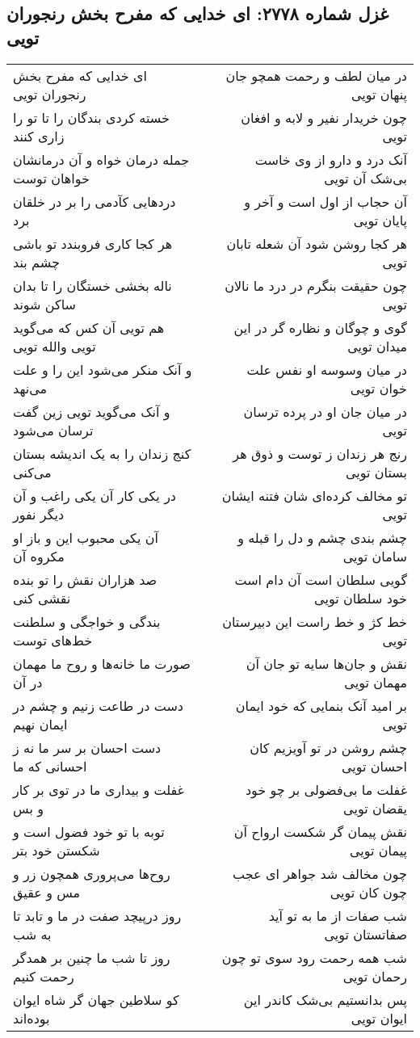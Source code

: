 \begin{center}
\section*{غزل شماره ۲۷۷۸: ای خدایی که مفرح بخش رنجوران تویی}
\label{sec:2778}
\begin{longtable}{l p{0.5cm} r}
ای خدایی که مفرح بخش رنجوران تویی
&&
در میان لطف و رحمت همچو جان پنهان تویی
\\
خسته کردی بندگان را تا تو را زاری کنند
&&
چون خریدار نفیر و لابه و افغان تویی
\\
جمله درمان خواه و آن درمانشان خواهان توست
&&
آنک درد و دارو از وی خاست بی‌شک آن تویی
\\
دردهایی کآدمی را بر در خلقان برد
&&
آن حجاب از اول است و آخر و پایان تویی
\\
هر کجا کاری فروبندد تو باشی چشم بند
&&
هر کجا روشن شود آن شعله تابان تویی
\\
ناله بخشی خستگان را تا بدان ساکن شوند
&&
چون حقیقت بنگرم در درد ما نالان تویی
\\
هم تویی آن کس که می‌گوید تویی والله تویی
&&
گوی و چوگان و نظاره گر در این میدان تویی
\\
و آنک منکر می‌شود این را و علت می‌نهد
&&
در میان وسوسه او نفس علت خوان تویی
\\
و آنک می‌گوید تویی زین گفت ترسان می‌شود
&&
در میان جان او در پرده ترسان تویی
\\
کنج زندان را به یک اندیشه بستان می‌کنی
&&
رنج هر زندان ز توست و ذوق هر بستان تویی
\\
در یکی کار آن یکی راغب و آن دیگر نفور
&&
تو مخالف کرده‌ای شان فتنه ایشان تویی
\\
آن یکی محبوب این و باز او مکروه آن
&&
چشم بندی چشم و دل را قبله و سامان تویی
\\
صد هزاران نقش را تو بنده نقشی کنی
&&
گویی سلطان است آن دام است خود سلطان تویی
\\
بندگی و خواجگی و سلطنت خط‌های توست
&&
خط کژ و خط راست این دبیرستان تویی
\\
صورت ما خانه‌ها و روح ما مهمان در آن
&&
نقش و جان‌ها سایه تو جان آن مهمان تویی
\\
دست در طاعت زنیم و چشم در ایمان نهیم
&&
بر امید آنک بنمایی که خود ایمان تویی
\\
دست احسان بر سر ما نه ز احسانی که ما
&&
چشم روشن در تو آویزیم کان احسان تویی
\\
غفلت و بیداری ما در توی بر کار و بس
&&
غفلت ما بی‌فضولی بر چو خود یقضان تویی
\\
توبه با تو خود فضول است و شکستن خود بتر
&&
نقش پیمان گر شکست ارواح آن پیمان تویی
\\
روح‌ها می‌پروری همچون زر و مس و عقیق
&&
چون مخالف شد جواهر ای عجب چون کان تویی
\\
روز درپیچد صفت در ما و تابد تا به شب
&&
شب صفات از ما به تو آید صفاتستان تویی
\\
روز تا شب ما چنین بر همدگر رحمت کنیم
&&
شب همه رحمت رود سوی تو چون رحمان تویی
\\
کو سلاطین جهان گر شاه ایوان بوده‌اند
&&
پس بدانستیم بی‌شک کاندر این ایوان تویی
\\
\end{longtable}
\end{center}
